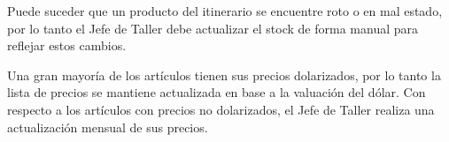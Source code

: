 \documentclass[12pt]{extarticle}
\begin{document}
\begin{spacing}{1.2}
    Puede suceder que un producto del itinerario se encuentre roto o en mal estado, por lo tanto el Jefe de Taller debe actualizar el stock de forma manual para reflejar estos cambios.

    Una gran mayoría de los artículos tienen sus precios dolarizados, por lo tanto la lista de precios se mantiene actualizada en base a la valuación del dólar. Con respecto a los artículos con precios no dolarizados, el Jefe de Taller realiza una actualización mensual de sus precios.
    
    
    \pagebreak

    
    \pagebreak



\end{spacing}
\end{document}
